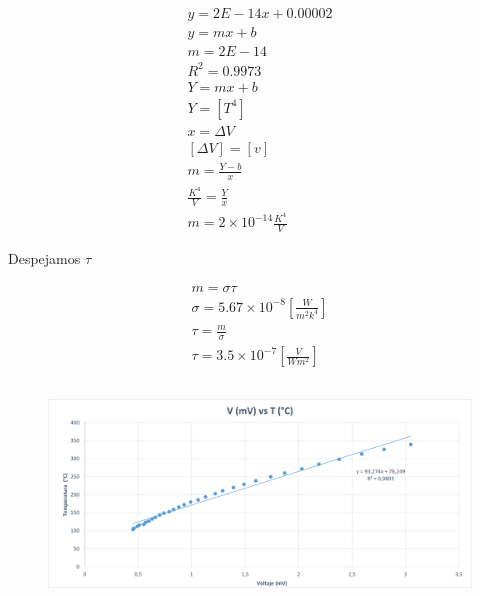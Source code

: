 \documentclass[letterpaper, 12pt]{article}
\begin{document}
\begin{equation*}
      \begin{gathered}
            y = 2E - 14x + 0.00002 \\
            y = mx + b \\
            m = 2E - 14 \\
            R^{2} = 0.9973 \\
            Y = mx + b \\
            Y = [T^4] \\
            x = \Delta V \\
            [\Delta V] = [v] \\
            m = \frac{Y - b}{x} \\
            \frac{K^4}{V} = \frac{Y}{x} \\
            m = 2 \times 10^{-14} \frac{K^{4}}{V}
      \end{gathered}
\end{equation*}

Despejamos $\tau$

\begin{equation*}
      \begin{gathered}
            m = \sigma \tau \\
            \sigma = 5.67 \times 10^{-8} [\frac{W}{m^{2} k^{4}}] \\
            \tau = \frac{m}{\sigma} \\
            \tau = 3.5 \times 10^{-7} [\frac{V}{W m^{2}}]
      \end{gathered}
\end{equation*}

\subsection{}

\begin{figure}[H]
      \begin{center}
            \includegraphics[width=\linewidth]{./Images/grafico1.png}
            \caption{}
      \end{center}
\end{figure}
\end{document}

